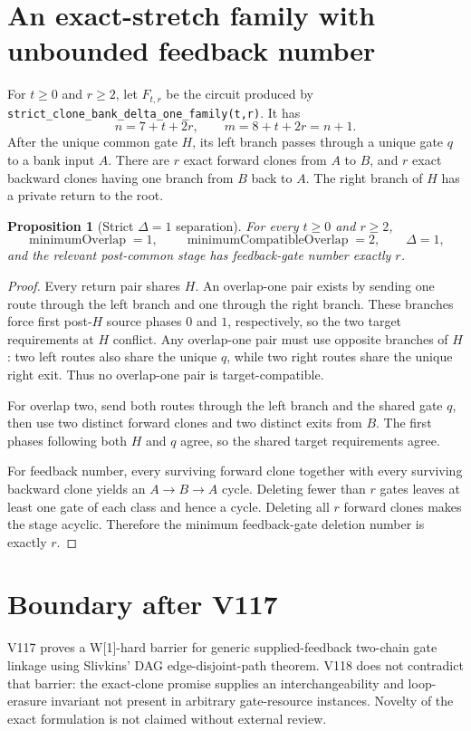 \documentclass[11pt]{article}
\newtheorem{proposition}{Proposition}
\begin{document}
\section{An exact-stretch family with unbounded feedback number}
For $t\geq0$ and $r\geq2$, let $F_{t,r}$ be the circuit produced by \texttt{strict\_clone\_bank\_delta\_one\_family(t,r)}. It has
\[
n=7+t+2r,\qquad m=8+t+2r=n+1.
\]
After the unique common gate $H$, its left branch passes through a unique gate $q$ to a bank input $A$. There are $r$ exact forward clones from $A$ to $B$, and $r$ exact backward clones having one branch from $B$ back to $A$. The right branch of $H$ has a private return to the root.

\begin{proposition}[Strict $\Delta=1$ separation]
For every $t\geq0$ and $r\geq2$,
\[
\operatorname{minimumOverlap}=1,\qquad
\operatorname{minimumCompatibleOverlap}=2,\qquad
\Delta=1,
\]
and the relevant post-common stage has feedback-gate number exactly $r$.
\end{proposition}
\begin{proof}
Every return pair shares $H$. An overlap-one pair exists by sending one route through the left branch and one through the right branch. These branches force first post-$H$ source phases $0$ and $1$, respectively, so the two target requirements at $H$ conflict. Any overlap-one pair must use opposite branches of $H$: two left routes also share the unique $q$, while two right routes share the unique right exit. Thus no overlap-one pair is target-compatible.

For overlap two, send both routes through the left branch and the shared gate $q$, then use two distinct forward clones and two distinct exits from $B$. The first phases following both $H$ and $q$ agree, so the shared target requirements agree.

For feedback number, every surviving forward clone together with every surviving backward clone yields an $A\to B\to A$ cycle. Deleting fewer than $r$ gates leaves at least one gate of each class and hence a cycle. Deleting all $r$ forward clones makes the stage acyclic. Therefore the minimum feedback-gate deletion number is exactly $r$.
\end{proof}

\section{Boundary after V117}
V117 proves a W[1]-hard barrier for generic supplied-feedback two-chain gate linkage using Slivkins' DAG edge-disjoint-path theorem. V118 does not contradict that barrier: the exact-clone promise supplies an interchangeability and loop-erasure invariant not present in arbitrary gate-resource instances. Novelty of the exact formulation is not claimed without external review.
\end{document}
